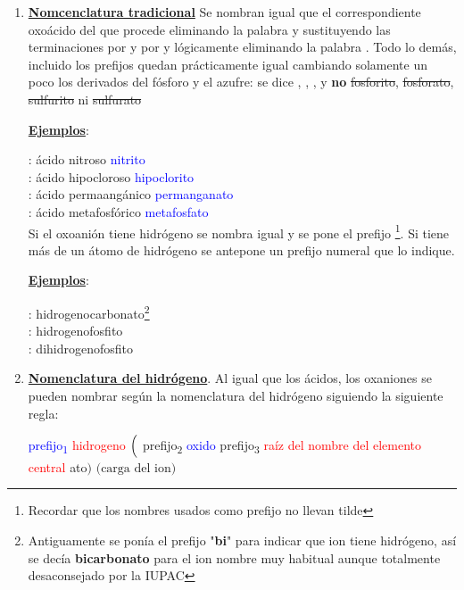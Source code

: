 \documentclass[11pt, a4paper]{article}
\begin{document}
\begin{enumerate}
    \item \textbf{\uline{Nomcenclatura tradicional}} Se nombran igual que el correspondiente oxoácido del que procede eliminando la palabra  y sustituyendo las terminaciones  por  y  por  y lógicamente eliminando la palabra . Todo lo demás, incluido los prefijos quedan prácticamente igual cambiando solamente un poco los derivados del fósforo y el azufre: se dice , , ,  y \textbf{no} \sout{fosforito}, \sout{fosforato}, \sout{sulfurito} ni \sout{sulfurato}

          \textbf{\uline{Ejemplos}}:

           :  ácido nitroso \ch{->}  \textcolor{blue}{nitrito}\\
           :  ácido hipocloroso \ch{->}  \textcolor{blue}{hipoclorito}\\
           :  ácido permaangánico \ch{->}  \textcolor{blue}{permanganato}\\
           :  ácido metafosfórico \ch{->}  \textcolor{blue}{metafosfato}\\

          Si el oxoanión tiene hidrógeno se nombra igual y se pone el prefijo \footnote{Recordar que los nombres usados como prefijo no llevan tilde}. Si tiene más de un átomo de hidrógeno se antepone un prefijo numeral que lo indique.

          \textbf{\uline{Ejemplos}}:

           :  hidrogenocarbonato\footnote{Antiguamente se ponía el prefijo "\textbf{bi}" para indicar que ion tiene hidrógeno, así se decía \textbf{bicarbonato} para el ion  nombre muy habitual aunque totalmente desaconsejado por la IUPAC}\\
           :  hidrogenofosfito\\
           :  dihidrogenofosfito

    \item \textbf{\uline{Nomenclatura del hidrógeno}}. Al igual que los ácidos, los oxaniones se pueden nombrar según la nomenclatura del hidrógeno siguiendo la siguiente regla:
          \begin{center}
              \textcolor{blue}{prefijo\textsubscript{1}} \textcolor{red}{hidrogeno} $\Bigl($ \textcolor{mygreen}{prefijo\textsubscript{2}} \textcolor{blue}{oxido} \textcolor{myBlue}{prefijo\textsubscript{3}} \textcolor{red}{raíz del nombre del elemento central} \textcolor{mygreen}{ato}$\Bigr)$ $\bigl( \text{carga del ion}\bigr)$
          \end{center}


\end{enumerate}
\end{document}
